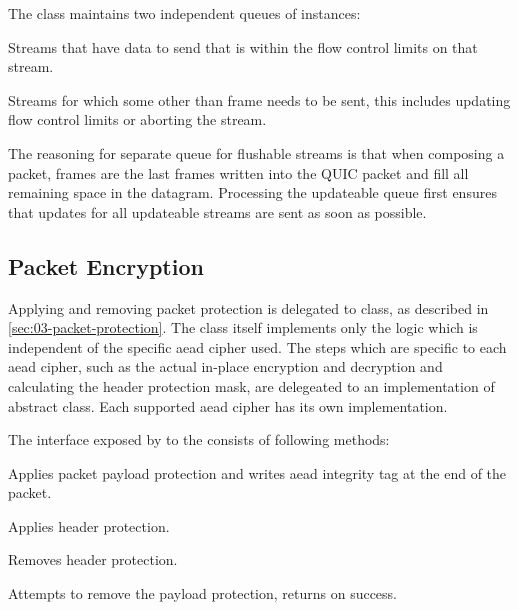 The \StreamCollection{} class maintains two independent queues of \ManagedQuicStream{} instances:

\begin{itemize}

   Streams that have data to send that is within the flow control limits on that stream.

   Streams for which some other than \STREAM{} frame needs to be sent, this includes updating flow control limits or aborting the stream.

\end{itemize}

The reasoning for separate queue for flushable streams is that when composing a packet, \STREAM{}
frames are the last frames written into the QUIC packet and fill all remaining space in the
datagram. Processing the updateable queue first ensures that updates for all updateable streams are
sent as soon as possible.

\subsection{Packet Encryption}

Applying and removing packet protection is delegated to \CryptoSeal{} class, as described in
\autoref{sec:03-packet-protection}. The \CryptoSeal{} class itself implements only the logic which
is independent of the specific \gls{aead} cipher used. The steps which are specific to each
\gls{aead} cipher, such as the actual in-place encryption and decryption and calculating the header
protection mask, are delegeated to an implementation of \CryptoSealAlgorithm{} abstract class. Each
supported \gls{aead} cipher has its own \CryptoSealAlgorithm{} implementation.

The interface exposed by \CryptoSeal{} to the \ManagedQuicConnection{} consists of following
methods:

\begin{description}

        Applies packet payload protection and writes \gls{aead} integrity tag at the end of the packet.

        Applies header protection.

        Removes header protection.

        Attempts to remove the payload protection, returns  on success.

\end{description}

